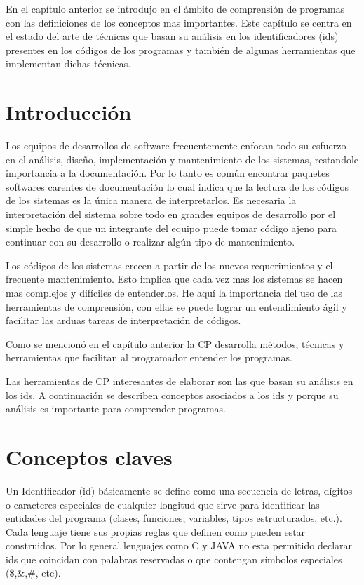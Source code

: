 \documentclass[12pt]{report}
\begin{document}

En el capítulo anterior se introdujo en el ámbito de comprensión de programas con las definiciones de los conceptos mas importantes. Este capítulo se centra en el estado del arte de técnicas que basan su análisis en los identificadores (ids) presentes en los códigos de los programas y también de algunas herramientas que implementan dichas técnicas.

\section{Introducción}

Los equipos de desarrollos de software frecuentemente enfocan todo su esfuerzo en el análisis, diseño, implementación y mantenimiento de los sistemas, restandole importancia a la documentación. Por lo tanto es común encontrar paquetes softwares carentes de documentación lo cual indica que la lectura de los códigos de los sistemas es la única manera de interpretarlos. Es necesaria la interpretación del sistema sobre todo en grandes equipos de desarrollo por el simple hecho de que un integrante del equipo puede tomar código ajeno para continuar con su desarrollo o realizar algún tipo de mantenimiento.

Los códigos de los sistemas crecen a partir de los nuevos requerimientos y el frecuente mantenimiento. Esto implica que cada vez mas los sistemas se hacen mas complejos y difíciles de entenderlos. He aquí la importancia del uso de las herramientas de comprensión, con ellas se puede lograr un entendimiento ágil y facilitar las arduas tareas de interpretación de códigos.

Como se mencionó en el capítulo anterior la CP desarrolla métodos, técnicas y herramientas que facilitan al programador entender los programas. 

Las herramientas de CP interesantes de elaborar son las que basan su análisis en los ids. A continuación se describen conceptos asociados a los ids y porque su análisis es importante para comprender programas.

\section{Conceptos claves}

Un Identificador (id) básicamente se define como una secuencia de letras, dígitos o caracteres especiales de cualquier longitud que sirve para identificar las entidades del programa (clases, funciones, variables, tipos estructurados, etc.). 
Cada lenguaje tiene sus propias reglas que definen como pueden estar construidos. Por lo general lenguajes como C y JAVA no esta permitido declarar ids que coincidan con palabras reservadas o que contengan símbolos especiales (\$,\&,\#, etc).
\end{document}
